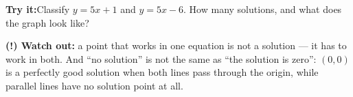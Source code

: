 \documentclass[12pt]{article}
\begin{document}
\begin{tryitbox}
\textbf{Try it:}\quad Classify $y = 5x + 1$ and $y = 5x - 6$. How many solutions,
and what does the graph look like?\\[2pt]
\end{tryitbox}

\begin{watchoutbox}
\textbf{(!) Watch out:} a point that works in one equation is not a solution ---
it has to work in both. And ``no solution'' is not the same as ``the solution is
zero'': $(0, 0)$ is a perfectly good solution when both lines pass through the
origin, while parallel lines have no solution point at all.
\end{watchoutbox}
\end{document}
